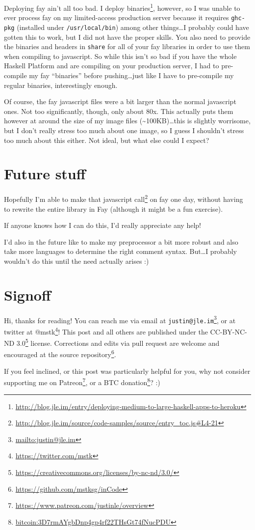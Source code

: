 \documentclass[]{article}
\renewcommand{\href}[2]{#2\footnote{\url{#1}}}
\begin{document}
Deploying fay ain't all too bad. I
\href{http://blog.jle.im/entry/deploying-medium-to-large-haskell-apps-to-heroku}{deploy
binaries}, however, so I was unable to ever process fay on my limited-access
production server because it requires \texttt{ghc-pkg} (installed under
\texttt{/usr/local/bin}) among other things\ldots I probably could have gotten
this to work, but I did not have the proper skills. You also need to provide the
binaries and headers in \texttt{share} for all of your fay libraries in order to
use them when compiling to javascript. So while this isn't so bad if you have
the whole Haskell Platform and are compiling on your production server, I had to
pre-compile my fay ``binaries'' before pushing\ldots just like I have to
pre-compile my regular binaries, interestingly enough.

Of course, the fay javascript files were a bit larger than the normal javascript
ones. Not too significantly, though, only about 80x. This actually puts them
however at around the size of my image files (\textasciitilde100KB)\ldots this
is slightly worrisome, but I don't really stress too much about one image, so I
guess I shouldn't stress too much about this either. Not ideal, but what else
could I expect?

\section{Future stuff}\label{future-stuff}

Hopefully I'm able to make
\href{http://blog.jle.im/source/code-samples/source/entry_toc.js\#L4-21}{that
javascript call} on fay one day, without having to rewrite the entire library in
Fay (although it might be a fun exercise).

If anyone knows how I can do this, I'd really appreciate any help!

I'd also in the future like to make my preprocessor a bit more robust and also
take more languages to determine the right comment syntax. But\ldots I probably
wouldn't do this until the need actually arises :)

\section{Signoff}\label{signoff}

Hi, thanks for reading! You can reach me via email at
\href{mailto:justin@jle.im}{\nolinkurl{justin@jle.im}}, or at twitter at
\href{https://twitter.com/mstk}{@mstk}! This post and all others are published
under the \href{https://creativecommons.org/licenses/by-nc-nd/3.0/}{CC-BY-NC-ND
3.0} license. Corrections and edits via pull request are welcome and encouraged
at \href{https://github.com/mstksg/inCode}{the source repository}.

If you feel inclined, or this post was particularly helpful for you, why not
consider \href{https://www.patreon.com/justinle/overview}{supporting me on
Patreon}, or a \href{bitcoin:3D7rmAYgbDnp4gp4rf22THsGt74fNucPDU}{BTC donation}?
:)
\end{document}
